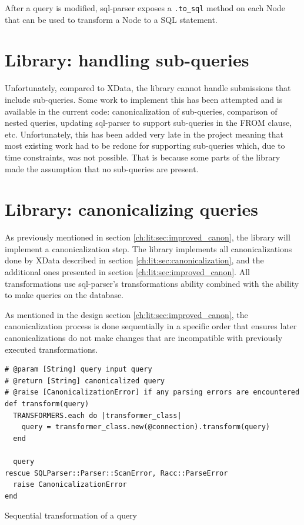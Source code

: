 After a query is modified, sql-parser exposes a \texttt{.to_sql} method on each Node that can be used to transform a Node to a SQL statement.

\section{Library: handling sub-queries}

Unfortunately, compared to XData, the library cannot handle submissions that include sub-queries. Some work to implement this has been attempted and is available in the current code: canonicalization of sub-queries, comparison of nested queries, updating sql-parser to support sub-queries in the FROM clause, etc. Unfortunately, this has been added very late in the project meaning that most existing work had to be redone for supporting sub-queries which, due to time constraints, was not possible. That is because some parts of the library made the assumption that no sub-queries are present.

\section{Library: canonicalizing queries}

As previously mentioned in section \ref{ch:lit:sec:improved_canon}, the library will implement a canonicalization step. The library implements all canonicalizations done by XData described in section \ref{ch:lit:sec:canonicalization}, and the additional ones presented in section \ref{ch:lit:sec:improved_canon}. All transformations use sql-parser's transformations ability combined with the ability to make queries on the database.

As mentioned in the design section \ref{ch:lit:sec:improved_canon}, the canonicalization process is done sequentially in a specific order that ensures later canonicalizations do not make changes that are incompatible with previously executed transformations. 

\begin{code}
\begin{verbatim}
# @param [String] query input query
# @return [String] canonicalized query
# @raise [CanonicalizationError] if any parsing errors are encountered
def transform(query)
  TRANSFORMERS.each do |transformer_class|
    query = transformer_class.new(@connection).transform(query)
  end

  query
rescue SQLParser::Parser::ScanError, Racc::ParseError
  raise CanonicalizationError
end
\end{verbatim}
\caption{Sequential transformation of a query}
\label{fig:sequential transformation of a query}
\end{code}


